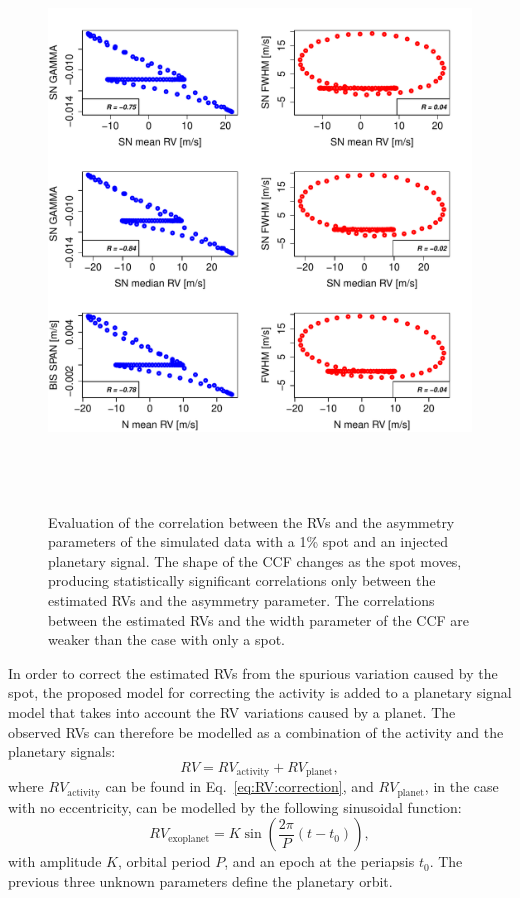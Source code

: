 \documentclass{aa}
\begin{document}
\begin{figure}[htbp]
\begin{center}
\includegraphics[height = 6in]{SOAP_SPOT_PLANET_Comparison_para_SN.pdf} 
   \caption{Evaluation of the correlation between the RVs and the asymmetry parameters of the simulated data with a 1\% spot and an injected planetary signal.  The shape of the CCF changes as the spot moves, producing statistically significant correlations only between the estimated RVs and the asymmetry parameter. The correlations between the estimated RVs and the width parameter of the CCF are weaker than the case with only a spot.}
    \label{fig:spot.plus.planet.corr}
\end{center}
\end{figure}

In order to correct the estimated RVs from the spurious variation caused by the spot, the proposed model for correcting the activity is added to a planetary signal model that takes into account the RV variations caused by a planet. The observed RVs can therefore be modelled as a combination of the activity and the planetary signals:
%
\begin{equation}
RV= RV_{\text{activity}} + RV_{\text{planet}},
\label{eq:RV:correction.overall}
\end{equation}
%
where $RV_{\text{activity}}$ can be found in Eq.~\eqref{eq:RV:correction}, and $RV_{\text{planet}}$, in the case with no eccentricity, can be modelled by the following sinusoidal function:
%
\begin{equation}
RV_{\text{exoplanet}}= K \sin \left(\frac{2 \pi}{P} (t - t_{0})\right),
\label{eq:RV:correction.planet}
\end{equation}
%
with amplitude $K$, orbital period $P$, and an epoch at the periapsis $t_{0}$.  The previous three unknown parameters define the planetary orbit.
\end{document}
